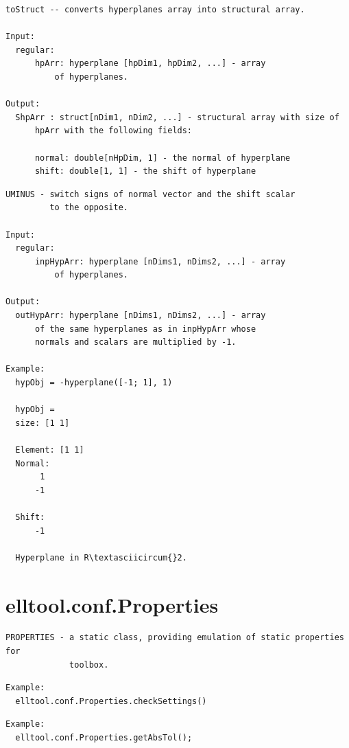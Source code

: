 \documentclass[letterpaper,10pt,english]{sphinxmanual}
\begin{document}
\begin{Verbatim}[commandchars=\\\{\}]
toStruct -- converts hyperplanes array into structural array.

Input:
  regular:
      hpArr: hyperplane [hpDim1, hpDim2, ...] - array
          of hyperplanes.

Output:
  ShpArr : struct[nDim1, nDim2, ...] - structural array with size of
      hpArr with the following fields:

      normal: double[nHpDim, 1] - the normal of hyperplane
      shift: double[1, 1] - the shift of hyperplane
\end{Verbatim}

\begin{Verbatim}[commandchars=\\\{\}]
UMINUS - switch signs of normal vector and the shift scalar
         to the opposite.

Input:
  regular:
      inpHypArr: hyperplane [nDims1, nDims2, ...] - array
          of hyperplanes.

Output:
  outHypArr: hyperplane [nDims1, nDims2, ...] - array
      of the same hyperplanes as in inpHypArr whose
      normals and scalars are multiplied by -1.

Example:
  hypObj = -hyperplane([-1; 1], 1)

  hypObj =
  size: [1 1]

  Element: [1 1]
  Normal:
       1
      -1

  Shift:
      -1

  Hyperplane in R\textasciicircum{}2.
\end{Verbatim}


\section{elltool.conf.Properties}
\label{chap_func:elltool-conf-properties}
\begin{Verbatim}[commandchars=\\\{\}]
PROPERTIES - a static class, providing emulation of static properties for
             toolbox.
\end{Verbatim}

\begin{Verbatim}[commandchars=\\\{\}]
Example:
  elltool.conf.Properties.checkSettings()
\end{Verbatim}

\begin{Verbatim}[commandchars=\\\{\}]
Example:
  elltool.conf.Properties.getAbsTol();
\end{Verbatim}
\end{document}
